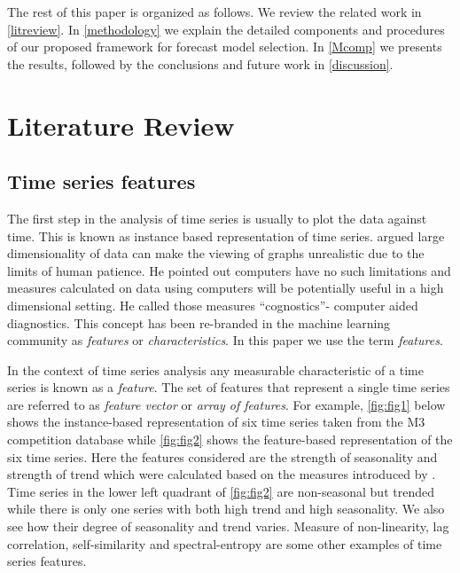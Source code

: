 \documentclass[11pt,a4paper,]{article}
\theoremstyle{definition}
\theoremstyle{definition}
\theoremstyle{definition}
\theoremstyle{remark}
\begin{document}
The rest of this paper is organized as follows. We review the related
work in \autoref{litreview}. In \autoref{methodology} we explain the
detailed components and procedures of our proposed framework for
forecast model selection. In \autoref{Mcomp} we presents the results,
followed by the conclusions and future work in \autoref{discussion}.

\section{Literature Review}\label{litreview}

\subsection{Time series features}\label{time-series-features}

The first step in the analysis of time series is usually to plot the
data against time. This is known as instance based representation of
time series. \textcite{tukey1988computer} argued large dimensionality of
data can make the viewing of graphs unrealistic due to the limits of
human patience. He pointed out computers have no such limitations and
measures calculated on data using computers will be potentially useful
in a high dimensional setting. He called those measures ``cognostics''-
computer aided diagnostics. This concept has been re-branded in the
machine learning community as \emph{features} or \emph{characteristics}.
In this paper we use the term \emph{features}.

In the context of time series analysis any measurable characteristic of
a time series is known as a \emph{feature}. The set of features that
represent a single time series are referred to as \emph{feature vector}
or \emph{array of features}. For example, \autoref{fig:fig1} below shows
the instance-based representation of six time series taken from the M3
competition database while \autoref{fig:fig2} shows the feature-based
representation of the six time series. Here the features considered are
the strength of seasonality and strength of trend which were calculated
based on the measures introduced by \textcite{wang2009rule}. Time series
in the lower left quadrant of \autoref{fig:fig2} are non-seasonal but
trended while there is only one series with both high trend and high
seasonality. We also see how their degree of seasonality and trend
varies. Measure of non-linearity, lag correlation, self-similarity and
spectral-entropy are some other examples of time series features.
\end{document}
